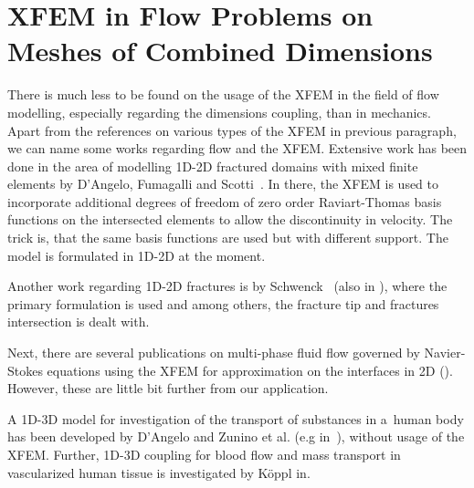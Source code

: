 \section{XFEM in Flow Problems on Meshes of Combined Dimensions} \label{sec:soa_xfem_combined}


There is much less to be found on the usage of the XFEM in the field of flow modelling, especially regarding the dimensions coupling,
than in mechanics.
Apart from the references on various types of the XFEM in previous paragraph, we can name some works regarding flow and the XFEM.
Extensive work has been done in the area of modelling 1D-2D fractured domains with mixed finite 
elements by D'Angelo, Fumagalli and Scotti~\cite{fumagalli_numerical_2012, dangelo_mixed_2012, fumagalli_efficient_2014}. 
In there, the XFEM is used to incorporate additional degrees of freedom of zero order Raviart-Thomas basis 
functions on the intersected elements to allow the discontinuity in velocity. The trick is, that the same
basis functions are used but with different support. The model is formulated in 1D-2D at the moment.

Another work regarding 1D-2D fractures is by Schwenck~\cite{schwenck_xfem-based_2015} (also in \cite{schwenck_2015}), 
where the primary formulation is used and among others, the fracture tip and fractures intersection is dealt with.

Next, there are several publications on multi-phase fluid flow governed by Navier-Stokes equations using the XFEM for
approximation on the interfaces in 2D (\cite{diez_stable_2013,sauerland_stable_2013}). However, these are
little bit further from our application.

A 1D-3D model for investigation of the transport of substances in a~human body has been developed by D'Angelo 
and Zunino et al. (e.g in~\cite{dangelo_coupling_2008,cattaneo_numerical_2015}), without usage of the XFEM.
Further, 1D-3D coupling for blood flow and mass transport in vascularized human tissue is
investigated by K{\" o}ppl in\cite{koppl_tum_2015}.
